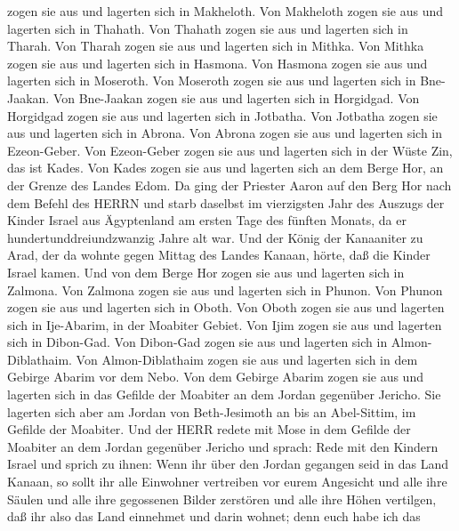 zogen sie aus und lagerten sich in Makheloth.  Von
Makheloth zogen sie aus und lagerten sich in Thahath.  Von
Thahath zogen sie aus und lagerten sich in Tharah.  Von
Tharah zogen sie aus und lagerten sich in Mithka.  Von
Mithka zogen sie aus und lagerten sich in Hasmona.  Von
Hasmona zogen sie aus und lagerten sich in Moseroth.  Von
Moseroth zogen sie aus und lagerten sich in Bne-Jaakan. 
Von Bne-Jaakan zogen sie aus und lagerten sich in Horgidgad.
 Von Horgidgad zogen sie aus und lagerten sich in Jotbatha.
 Von Jotbatha zogen sie aus und lagerten sich in Abrona.
 Von Abrona zogen sie aus und lagerten sich in Ezeon-Geber.
 Von Ezeon-Geber zogen sie aus und lagerten sich in der
Wüste Zin, das ist Kades.  Von Kades zogen sie aus und
lagerten sich an dem Berge Hor, an der Grenze des Landes Edom.
 Da ging der Priester Aaron auf den Berg Hor nach dem
Befehl des HERRN und starb daselbst im vierzigsten Jahr des Auszugs der
Kinder Israel aus Ägyptenland am ersten Tage des fünften Monats,
 da er hundertunddreiundzwanzig Jahre alt war.
 Und der König der Kanaaniter zu Arad, der da wohnte gegen
Mittag des Landes Kanaan, hörte, daß die Kinder Israel kamen.
 Und von dem Berge Hor zogen sie aus und lagerten sich in
Zalmona.  Von Zalmona zogen sie aus und lagerten sich in
Phunon.  Von Phunon zogen sie aus und lagerten sich in
Oboth.  Von Oboth zogen sie aus und lagerten sich in
Ije-Abarim, in der Moabiter Gebiet.  Von Ijim zogen sie aus
und lagerten sich in Dibon-Gad.  Von Dibon-Gad zogen sie
aus und lagerten sich in Almon-Diblathaim.  Von
Almon-Diblathaim zogen sie aus und lagerten sich in dem Gebirge Abarim
vor dem Nebo.  Von dem Gebirge Abarim zogen sie aus und
lagerten sich in das Gefilde der Moabiter an dem Jordan gegenüber
Jericho.  Sie lagerten sich aber am Jordan von
Beth-Jesimoth an bis an Abel-Sittim, im Gefilde der Moabiter.
 Und der HERR redete mit Mose in dem Gefilde der Moabiter
an dem Jordan gegenüber Jericho und sprach:  Rede mit den
Kindern Israel und sprich zu ihnen: Wenn ihr über den Jordan gegangen
seid in das Land Kanaan,  so sollt ihr alle Einwohner
vertreiben vor eurem Angesicht und alle ihre Säulen und alle ihre
gegossenen Bilder zerstören und alle ihre Höhen vertilgen, 
daß ihr also das Land einnehmet und darin wohnet; denn euch habe ich das

